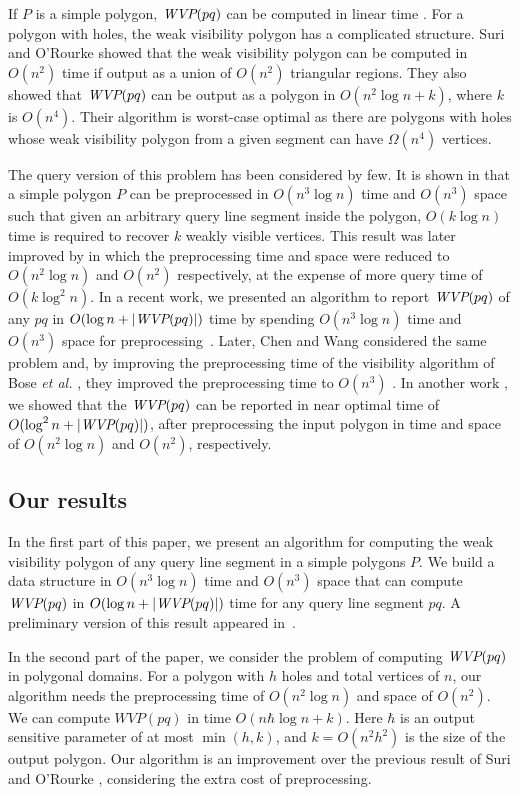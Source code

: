 \documentclass[5p]{elsarticle}
\def\WVP{\mbox{\it{WVP}}}
\def\P{\mbox{${P}$}}
\begin{document}
If $\P$ is a simple polygon, $\WVP(pq)$ can be computed in linear time \cite{guibas,toussainta}.
For a polygon with holes, the weak visibility polygon has a complicated structure.
Suri and O'Rourke \cite{suri} 
showed that the weak visibility polygon can be computed in $O(n^2)$ time
if output as a union of $O(n^2)$ triangular regions. They also showed that
$\WVP(pq)$ can be output as a polygon in $O(n^2 \log n + k)$, where $k$ is $O(n^4)$.
Their algorithm is worst-case optimal as there are polygons with holes whose weak visibility 
polygon from a given segment can have $\Omega(n^4)$ vertices.

The query version of this problem has been considered by few.
It is shown in \cite{bose} that a simple polygon $\P$ can be preprocessed 
in $O(n^3 \log n)$ time and $O(n^3)$ space
such that given an arbitrary query line segment inside the polygon, 
$O(k \log n)$ time is required to recover $k$ weakly visible vertices.
This result was later improved by \cite{aronov} in which the preprocessing time and space were 
reduced to $O(n^2 \log n)$ and $O(n^2)$ respectively, at the expense of more query 
time of $O(k \log^2 n )$.
In a recent work, we presented an algorithm to report $\WVP(pq)$
of any $pq$ in $O(\log n + |\WVP(pq)|)$ time by spending $O(n^3 \log n)$
time and  $O(n^3)$ space for preprocessing~\cite{nouri}.
Later, Chen and Wang considered the same problem and, by improving the 
preprocessing time of the visibility algorithm of Bose {\em et al.} \cite{bose},
they improved the preprocessing time to $O(n^3)$ \cite{chen2}.
In another work \cite{nouri2}, we showed that the $\WVP(pq)$ 
can be reported in near optimal time of $O(\log^2 n + |\WVP(pq)|)$, 
after preprocessing the input polygon in time and space of $O(n^2 \log n)$
and $O(n^2)$, respectively. 



\subsection{Our results}

In the first part of this paper, we present an algorithm for computing the weak visibility 
polygon of any query line segment in a simple polygons $\P$.
We build a data structure in $O(n^3 \log n)$ time and $O(n^3)$ space that can compute 
$\WVP(pq)$  in $O(\log n + |\WVP(pq)|)$ time for any query line segment $pq$.
A preliminary version of this result appeared in~\cite{nouri}.

In the second part of the paper, we consider the problem of computing $\WVP(pq)$ in polygonal domains.
For a polygon with $h$ holes and total vertices of $n$, our algorithm needs the preprocessing
time of $O(n^2 \log n)$ and space of $O(n^2)$. 
We can compute $WVP(pq)$ in time $O(n\hbar \log n + k)$. 
Here $\hbar$ is an output sensitive parameter of at most $\min(h,k)$,
and $k = O(n^2h^2)$ is the size of the output polygon. 
Our algorithm is an improvement over the previous result of Suri and O'Rourke \cite{suri},
considering the extra cost of preprocessing.
\end{document}
